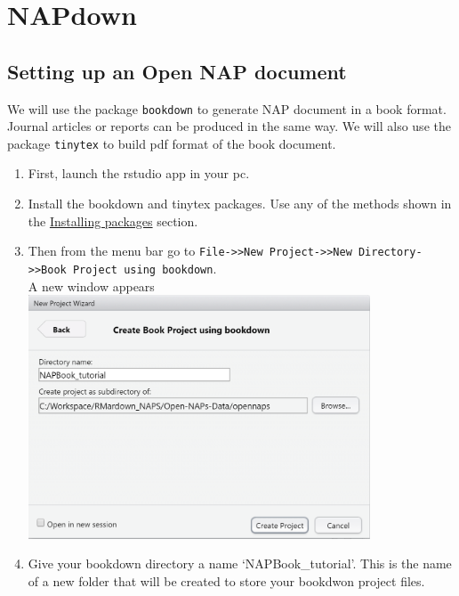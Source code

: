 \documentclass[
]{book}
\begin{document}
\hypertarget{napdown}{%
\chapter{NAPdown}\label{napdown}}

\hypertarget{setting-up-an-open-nap-document}{%
\section{Setting up an Open NAP document}\label{setting-up-an-open-nap-document}}

We will use the package \texttt{bookdown} to generate NAP document in a book format. Journal articles or reports can be produced in the same way.
We will also use the package \texttt{tinytex} to build pdf format of the book document.

\begin{enumerate}
\def\labelenumi{\arabic{enumi}.}
\item
  First, launch the rstudio app in your pc.
\item
  Install the bookdown and tinytex packages. Use any of the methods shown in the \protect\hyperlink{installing-packages}{Installing packages} section.\\
\item
  Then from the menu bar go to \texttt{File-\textgreater{}\textgreater{}New\ Project-\textgreater{}\textgreater{}New\ Directory-\textgreater{}\textgreater{}Book\ Project\ using\ bookdown}.\\
  A new window appears\\
  \includegraphics[width=4in,height=\textheight]{tutorial_screenshots/open_bkdown_proj.png}
\item
  Give your bookdown directory a name `NAPBook\_tutorial'. This is the name of a new folder that will be created to store your bookdwon project files.\\

\end{enumerate}
\end{document}
